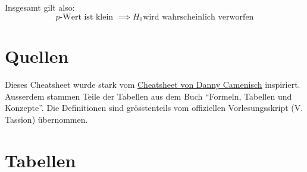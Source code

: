 \documentclass[a4paper,10pt]{article}
\begin{document}
Insgesamt gilt also:
\[p\text{-Wert ist klein } \implies H_0 \text{wird wahrscheinlich verworfen} \]

\section{Quellen}
Dieses Cheatsheet wurde stark vom \href{https://n.ethz.ch/~dcamenisch/summaries}{Cheatsheet von Danny Camenisch} inspiriert. Ausserdem stammen Teile der Tabellen aus dem Buch ``Formeln, Tabellen und Konzepte''. Die Definitionen sind grösstenteils vom offiziellen Vorlesungsskript (V. Tassion) übernommen.


\clearpage
\section{Tabellen}
\end{document}
